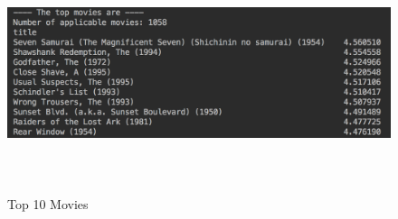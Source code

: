 \documentclass[12pt]{article}
\begin{document}
\begin{enumerate}
	\begin{figure}[H]
		\caption{Top 10 Movies}
		\label{fig:top_10_movies}
		\centering
		\includegraphics[height=7cm, width=17cm]{top_10_movies}
	\end{figure}
\end{enumerate}



\end{document}
